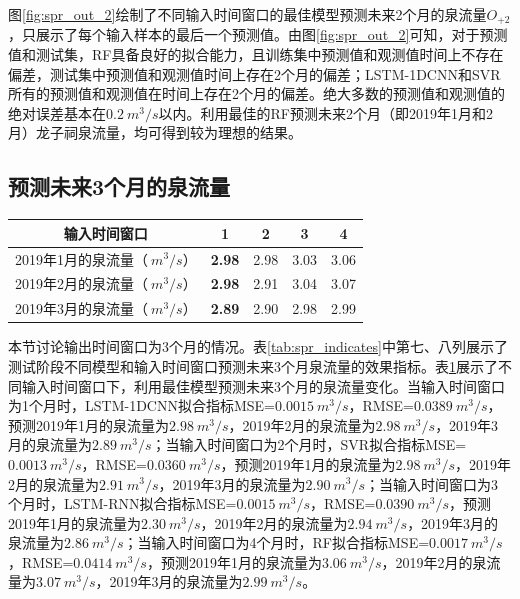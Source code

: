 图\ref{fig:spr_out_2}绘制了不同输入时间窗口的最佳模型预测未来2个月的泉流量$O_{+2}$，只展示了每个输入样本的最后一个预测值。由图\ref{fig:spr_out_2}可知，对于预测值和测试集，RF具备良好的拟合能力，且训练集中预测值和观测值时间上不存在偏差，测试集中预测值和观测值时间上存在2个月的偏差；LSTM-1DCNN和SVR所有的预测值和观测值在时间上存在2个月的偏差。绝大多数的预测值和观测值的绝对误差基本在$\SI{0.2}{m^{3}/s}$以内。利用最佳的RF预测未来2个月（即2019年1月和2月）龙子祠泉流量，均可得到较为理想的结果。

\subsection{预测未来3个月的泉流量}\label{sec:spr_three}

\begin{table}[!htbp]
  \centering
  \label{tab:spr_three}
  \footnotesize
  \begin{tabular}{ccccc}
    \toprule
    输入时间窗口 & 1 & 2 & 3 & 4 \\
    \midrule
    2019年1月的泉流量（$\SI{}{m^{3}/s}$）& \textbf{2.98} & 2.98 & 3.03 & 3.06  \\
    2019年2月的泉流量（$\SI{}{m^{3}/s}$）& \textbf{2.98} & 2.91 & 3.04 & 3.07  \\
    2019年3月的泉流量（$\SI{}{m^{3}/s}$）& \textbf{2.89} & 2.90 & 2.98 & 2.99  \\
    \bottomrule
  \end{tabular}
\end{table}

本节讨论输出时间窗口为3个月的情况。表\ref{tab:spr_indicates}中第七、八列展示了测试阶段不同模型和输入时间窗口预测未来3个月泉流量的效果指标。表\ref{tab:spr_three}展示了不同输入时间窗口下，利用最佳模型预测未来3个月的泉流量变化。当输入时间窗口为1个月时，LSTM-1DCNN拟合指标MSE=$\SI{0.0015}{m^{3}/s}$，RMSE=$\SI{0.0389}{m^{3}/s}$，预测2019年1月的泉流量为$\SI{2.98}{m^{3}/s}$，2019年2月的泉流量为$\SI{2.98}{m^{3}/s}$，2019年3月的泉流量为$\SI{2.89}{m^{3}/s}$；当输入时间窗口为2个月时，SVR拟合指标MSE=\\$\SI{0.0013}{m^{3}/s}$，RMSE=$\SI{0.0360}{m^{3}/s}$，预测2019年1月的泉流量为$\SI{2.98}{m^{3}/s}$，2019年2月的泉流量为$\SI{2.91}{m^{3}/s}$，2019年3月的泉流量为$\SI{2.90}{m^{3}/s}$；当输入时间窗口为3个月时，LSTM-RNN拟合指标MSE=$\SI{0.0015}{m^{3}/s}$，RMSE=$\SI{0.0390}{m^{3}/s}$，预测2019年1月的泉流量为$\SI{2.30}{m^{3}/s}$，2019年2月的泉流量为$\SI{2.94}{m^{3}/s}$，2019年3月的泉流量为$\SI{2.86}{m^{3}/s}$；当输入时间窗口为4个月时，RF拟合指标MSE=$\SI{0.0017}{m^{3}/s}$，RMSE=$\SI{0.0414}{m^{3}/s}$，预测2019年1月的泉流量为$\SI{3.06}{m^{3}/s}$，2019年2月的泉流量为$\SI{3.07}{m^{3}/s}$，2019年3月的泉流量为$\SI{2.99}{m^{3}/s}$。

